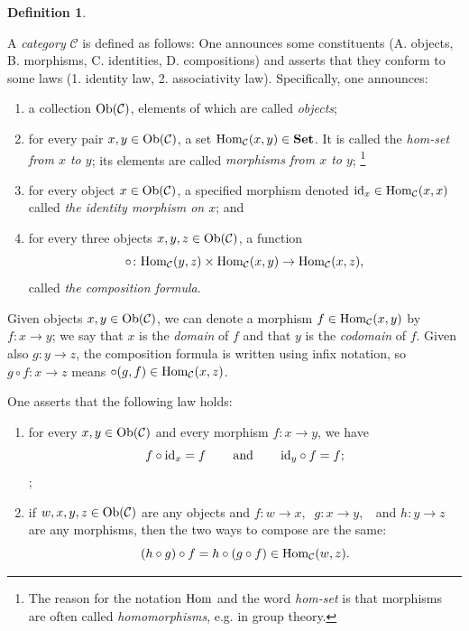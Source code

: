 \documentclass{book}
\def\tn{\textnormal}
\def\mc{\mathcal}
\def\Hom{\tn{Hom}}
\def\Ob{\tn{Ob}}
\def\hsp{\hspace{.3in}}
\def\to{\rightarrow}
\def\taking{\colon}
\def\id{\tn{id}}
\def\Set{{\bf Set}}
\def\mcC{\mc{C}}
\theoremstyle{remark}
\theoremstyle{definition}
\newtheorem{definition}[subsubsection]{Definition}
\begin{document}
\begin{definition}\label{def:category}

A {\em category} $\mcC$ is defined as follows: One announces some constituents (A. objects, B. morphisms, C. identities, D. compositions) and asserts that they conform to some laws (1. identity law, 2. associativity law). Specifically, one announces:
\begin{enumerate}[\hsp A.]
\item a collection $\Ob(\mcC)$, elements of which are called {\em objects};\index{a symbol!$\Ob$}
\item for every pair $x,y\in\Ob(\mcC)$, a set $\Hom_\mcC(x,y)\in\Set$.\index{a symbol!$\Hom_\mcC$} It is called the {\em hom-set from $x$ to $y$}; its elements are called {\em morphisms from $x$ to $y$};
\footnote{The reason for the notation $\Hom$ and the word {\em hom-set} is that morphisms are often called {\em homomorphisms}, e.g. in group theory.}
\item for every object $x\in\Ob(\mcC)$, a specified morphism denoted $\id_x\in\Hom_\mcC(x,x)$ called {\em the identity morphism on $x$}; and
\item for every three objects $x,y,z\in\Ob(\mcC)$, a function $$\circ\taking\Hom_\mcC(y,z)\times\Hom_\mcC(x,y)\to\Hom_\mcC(x,z),$$ called {\em the composition formula}.
\end{enumerate}
Given objects $x,y\in\Ob(\mcC)$, we can denote a morphism $f\in\Hom_\mcC(x,y)$ by $f\taking x\to y$; we say that $x$ is the {\em domain} of $f$ and that $y$ is the {\em codomain} of $f$. Given also $g\taking y\to z$, the composition formula is written using infix notation, so $g\circ f\taking x\to z$ means $\circ(g,f)\in\Hom_\mcC(x,z)$.

One asserts that the following law holds:
\begin{enumerate}[\hsp 1.]
\item for every $x,y\in\Ob(\mcC)$ and every morphism $f\taking x\to y$, we have
$$f\circ\id_x=f\hsp\tn{and}\hsp\id_y\circ f=f;$$ \hsp{and};
\item if $w,x,y,z\in\Ob(\mcC)$ are any objects and $f\taking w\to x,\;\;g\taking x\to y,\;\;$ and $h\taking y\to z$ are any morphisms, then the two ways to compose are the same:$$(h\circ g)\circ f = h\circ(g\circ f) \in\Hom_\mcC(w,z).$$
\end{enumerate}
\end{definition}
\end{document}
